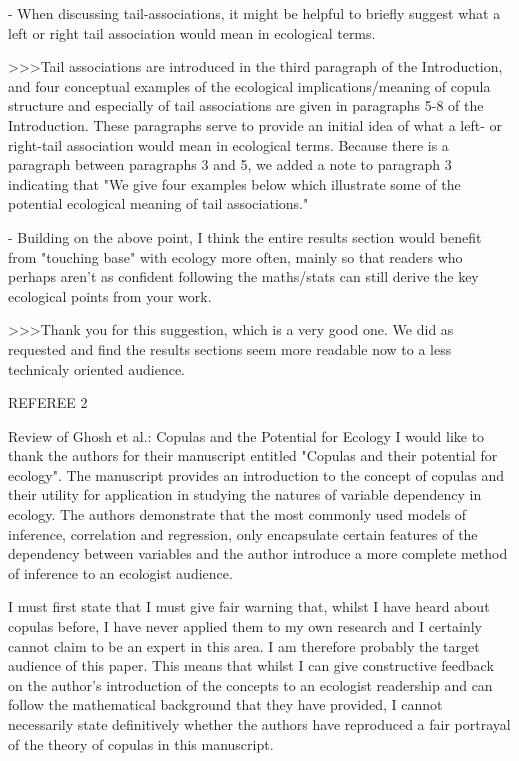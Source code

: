 - When discussing tail-associations, it might be helpful to briefly suggest what a left or right tail association would mean in ecological terms.

>>>Tail associations are introduced in the third paragraph of the Introduction, and four 
conceptual examples of the ecological implications/meaning of copula structure and especially 
of tail associations are given in paragraphs 5-8 of the Introduction. These paragraphs 
serve to provide an initial idea of what a left- or right-tail association would mean 
in ecological terms. Because there is a paragraph between paragraphs 3 and 5, we added 
a note to paragraph 3 indicating that "We give four examples below which illustrate some of the 
potential ecological meaning of tail associations."

- Building on the above point, I think the entire results section would benefit from "touching base" with ecology more often, mainly so that readers who perhaps aren't as confident following the maths/stats can still derive the key ecological points from your work.

>>>Thank you for this suggestion, which is a very good one. We did as requested and find 
the results sections seem more readable now to a less technicaly oriented audience.


REFEREE 2

Review of Ghosh et al.: Copulas and the Potential for Ecology
I would like to thank the authors for their manuscript entitled "Copulas and their potential 
for ecology".  The manuscript provides an introduction to the concept of copulas and their 
utility for application in studying the natures of variable dependency in ecology.  The 
authors demonstrate that the most commonly used models of inference, correlation and regression, 
only encapsulate certain features of the dependency between variables and the author introduce a 
more complete method of inference to an ecologist audience.

I must first state that I must give fair warning that, whilst I have heard about copulas before, 
I have never applied them to my own research and I certainly cannot claim to be an expert in this 
area.  I am therefore probably the target audience of this paper.  This means that whilst I can 
give constructive feedback on the author's introduction of the concepts to an ecologist readership 
and can follow the mathematical background that they have provided, I cannot necessarily state 
definitively whether the authors have reproduced a fair portrayal of the theory of copulas in this 
manuscript.

